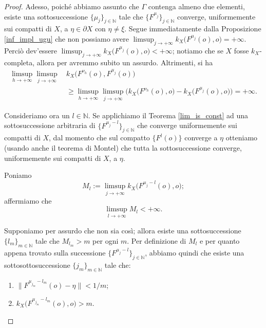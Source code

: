 \begin{proof}
    Adesso, poiché abbiamo assunto che $\Gamma$ contenga almeno due elementi, esiste una sottosuccessione $\{\mu_j\}_{j\in\mathbb{N}}$ tale che $\{F^{\mu_j}\}_{j\in\mathbb{N}}$ converge, uniformemente sui compatti di $X$, a $\eta\in\partial X$ con $\eta\not=\xi$. Segue immediatamente dalla Proposizione \ref{inf_impl_ugu} che non possiamo avere $\displaystyle\limsup_{j\longrightarrow+\infty} k_X\big(F^{\mu_j}(o),o\big)=+\infty$. Perciò dev'essere $\displaystyle\limsup_{j\longrightarrow+\infty} k_X\big(F^{\mu_j}(o),o\big)<+\infty$; notiamo che se $X$ fosse $k_X$-completa, allora per \cite[Proposition 2.3.17]{A1} avremmo subito un assurdo. Altrimenti, si ha
    \begin{equation} \label{daoainfinito}
        \begin{aligned}
            \limsup_{h\longrightarrow+\infty}\limsup_{j\longrightarrow+\infty}\, &k_X\big(F^{\nu_h}(o),F^{\mu_j}(o)\big) \\
            &\ge \limsup_{h\longrightarrow+\infty}\limsup_{j\longrightarrow+\infty} \Big(k_X\big(F^{\nu_h}(o),o\big)-k_X\big(F^{\mu_j}(o),o\big)\Big)=+\infty.
        \end{aligned}
    \end{equation}

    Consideriamo ora un $l\in\mathbb{N}$. Se applichiamo il Teorema \ref{lim_is_const} ad una sottosuccessione arbitraria di $\{F^{\mu_j-l}\}_{j\in\mathbb{N}}$ che converge uniformemente sui compatti di $X$, dal momento che sul compatto $\{F^l(o)\}$ converge a $\eta$ otteniamo (usando anche il teorema di Montel) che tutta la sottosuccessione converge, uniformemente sui compatti di $X$, a $\eta$.

    Poniamo
    $$M_l:=\limsup_{j\longrightarrow+\infty}k_X\big(F^{\mu_j-l}(o),o\big);$$
    affermiamo che
    $$\limsup_{l\longrightarrow+\infty}M_l<+\infty.$$

    Supponiamo per assurdo che non sia così; allora esiste una sottosuccessione $\{l_m\}_{m\in\mathbb{N}}$ tale che $M_{l_m}>m$ per ogni $m$. Per definizione di $M_l$ e per quanto appena trovato sulla successione $\{F^{\mu_j-l}\}_{j\in\mathbb{N}}$, abbiamo quindi che esiste una sottosottosuccessione $\{j_m\}_{m\in\mathbb{N}}$ tale che:
    \begin{enumerate}[label={(\arabic*)}]
        \item $\|F^{\mu_{j_m}-l_m}(o)-\eta\|<1/m$;
        \item $k_X\big(F^{\mu_{j_m}-l_m}(o),o\big)>m$.
    \end{enumerate}


\end{proof}
